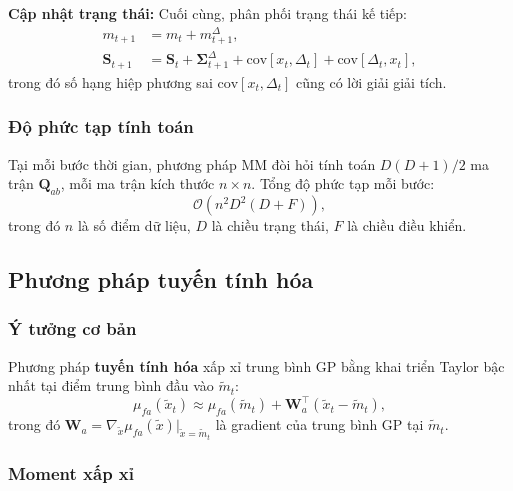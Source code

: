 \textbf{Cập nhật trạng thái:} Cuối cùng, phân phối trạng thái kế tiếp:
\begin{align}
    m_{t+1} &= m_t + m^\Delta_{t+1}, \label{state_mean_update} \\
    \mathbf{S}_{t+1} &= \mathbf{S}_t + \boldsymbol{\Sigma}^\Delta_{t+1} + \mathrm{cov}[x_t, \Delta_t] + \mathrm{cov}[\Delta_t, x_t],
    \label{state_cov_update}
\end{align}
trong đó số hạng hiệp phương sai $\mathrm{cov}[x_t, \Delta_t]$ cũng có lời giải giải tích.

\subsubsection{Độ phức tạp tính toán}
\label{SUB_SUB_SEC_mm_complexity}

Tại mỗi bước thời gian, phương pháp MM đòi hỏi tính toán $D(D+1)/2$ ma trận $\mathbf{Q}_{ab}$, mỗi ma trận kích thước $n \times n$. Tổng độ phức tạp mỗi bước:
\begin{equation}
    \mathcal{O}(n^2 D^2 (D+F)),
\end{equation}
trong đó $n$ là số điểm dữ liệu, $D$ là chiều trạng thái, $F$ là chiều điều khiển.

\subsection{Phương pháp tuyến tính hóa}
\label{SUB_SEC_linearization}

\subsubsection{Ý tưởng cơ bản}
\label{SUB_SUB_SEC_lin_idea}

Phương pháp \textbf{tuyến tính hóa} xấp xỉ trung bình GP bằng khai triển Taylor bậc nhất tại điểm trung bình đầu vào $\tilde{m}_t$:
\begin{equation}
    \mu_{fa}(\tilde{x}_t) \approx \mu_{fa}(\tilde{m}_t) + \mathbf{W}_a^\top (\tilde{x}_t - \tilde{m}_t),
    \label{linearization_approx}
\end{equation}
trong đó $\mathbf{W}_a = \nabla_{\tilde{x}} \mu_{fa}(\tilde{x})\big|_{\tilde{x}=\tilde{m}_t}$ là gradient của trung bình GP tại $\tilde{m}_t$.

\subsubsection{Moment xấp xỉ}
\label{SUB_SUB_SEC_lin_moments}

